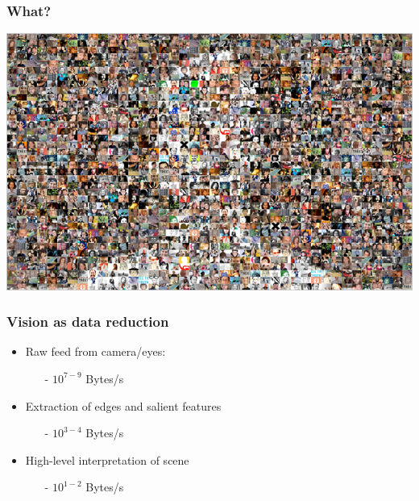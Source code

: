 \documentclass[notheorems,serif,table,compress]{beamer}  %
\begin{document}
  
\begin{frame}
\frametitle{What?}
  \begin{center}
  \includegraphics[width=1\linewidth]{people}
  \end{center}
\end{frame}


\begin{frame}
\frametitle{Vision as data reduction}
\begin{itemize}
\item Raw feed from camera/eyes:
\begin{itemize}
\item[-] {\huge \color{blue}$10^{7-9}$} Bytes/s
\end{itemize}
\item Extraction of edges and salient features
\begin{itemize}
\item[-] {\huge \color{blue}$10^{3-4}$} Bytes/s
\end{itemize}
\item High-level interpretation of scene
\begin{itemize}
\item[-] {\huge \color{blue}$10^{1-2}$} Bytes/s
\end{itemize}
\end{itemize}
\end{frame}
\end{document}
